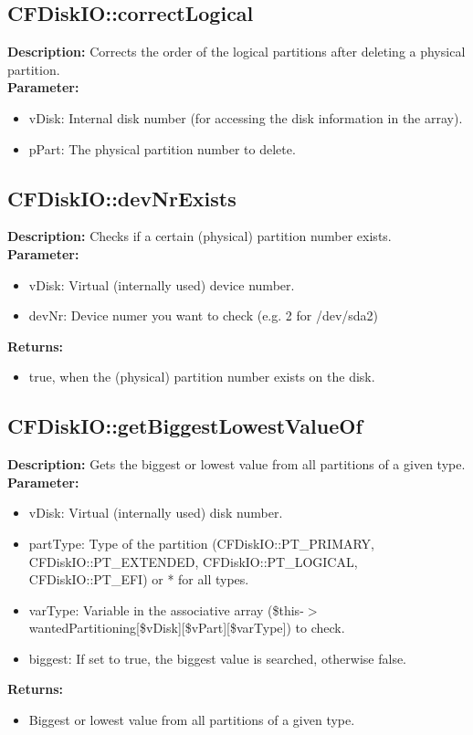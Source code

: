 \subsection{CFDiskIO::correctLogical}
\textbf{Description:} Corrects the order of the logical partitions after deleting a physical partition.\\
\textbf{Parameter:}
\begin{itemize}
\item vDisk: Internal disk number (for accessing the disk information in the array).
\item pPart: The physical partition number to delete.
\end{itemize}

\subsection{CFDiskIO::devNrExists}
\textbf{Description:} Checks if a certain (physical) partition number exists.\\
\textbf{Parameter:}
\begin{itemize}
\item vDisk: Virtual (internally used) device number.
\item devNr: Device numer you want to check (e.g. 2 for /dev/sda2)
\end{itemize}
\textbf{Returns:}
\begin{itemize}
\item true, when the (physical) partition number exists on the disk.
\end{itemize}

\subsection{CFDiskIO::getBiggestLowestValueOf}
\textbf{Description:} Gets the biggest or lowest value from all partitions of a given type.\\
\textbf{Parameter:}
\begin{itemize}
\item vDisk: Virtual (internally used) disk number.
\item partType: Type of the partition (CFDiskIO::PT\_PRIMARY, CFDiskIO::PT\_EXTENDED, CFDiskIO::PT\_LOGICAL, CFDiskIO::PT\_EFI) or * for all types.
\item varType: Variable in the associative array (\$this-$>$wantedPartitioning[\$vDisk][\$vPart][\$varType]) to check.
\item biggest: If set to true, the biggest value is searched, otherwise false.
\end{itemize}
\textbf{Returns:}
\begin{itemize}
\item Biggest or lowest value from all partitions of a given type.
\end{itemize}

